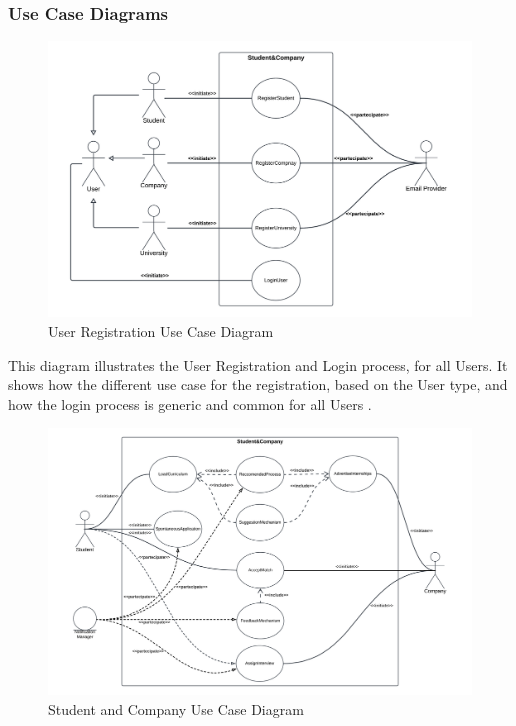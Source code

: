 \subsubsection{Use Case Diagrams}
\begin{figure}[H]
    \centering
    \includegraphics[width=1 \textwidth]{Latex/Images/RASD/UseCases/UserRegistrationUseCase.png}
    \caption{User Registration Use Case Diagram}
    \label{fig:UserRegistrationUseCaseDiagram}
\end{figure}
This diagram illustrates the User Registration and Login process, for all Users. It shows how the different use case for the registration, based on the User type, and how the login process is generic and common for all Users
\clearpage.
\begin{figure}[H]
    \centering
    \includegraphics[width=1 \textwidth]{Latex/Images/RASD/UseCases/StudentCompanyUseCase.png}
    \caption{Student and Company Use Case Diagram}
    \label{fig:StudentCompanyUseCaseDiagram}
\end{figure}

